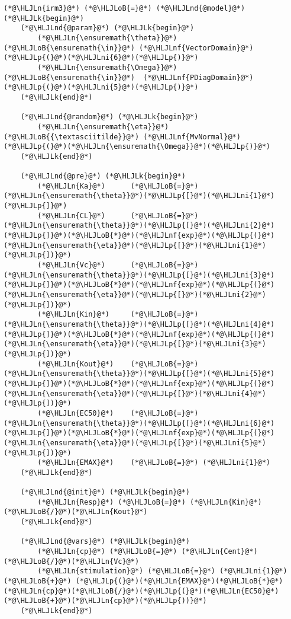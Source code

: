 \documentclass[12pt,a4paper]{article}
\newcommand{\HLJLk}[1]{\textcolor[RGB]{148,91,176}{\textbf{#1}}}
\newcommand{\HLJLn}[1]{#1}
\newcommand{\HLJLnd}[1]{\textcolor[RGB]{214,102,97}{#1}}
\newcommand{\HLJLnf}[1]{\textcolor[RGB]{66,102,213}{#1}}
\newcommand{\HLJLni}[1]{\textcolor[RGB]{59,151,46}{#1}}
\newcommand{\HLJLoB}[1]{\textcolor[RGB]{102,102,102}{\textbf{#1}}}
\newcommand{\HLJLp}[1]{#1}
\begin{document}
\begin{lstlisting}
(*@\HLJLn{irm3}@*) (*@\HLJLoB{=}@*) (*@\HLJLnd{@model}@*) (*@\HLJLk{begin}@*)
    (*@\HLJLnd{@param}@*) (*@\HLJLk{begin}@*)
        (*@\HLJLn{\ensuremath{\theta}}@*) (*@\HLJLoB{\ensuremath{\in}}@*) (*@\HLJLnf{VectorDomain}@*)(*@\HLJLp{(}@*)(*@\HLJLni{6}@*)(*@\HLJLp{)}@*)
        (*@\HLJLn{\ensuremath{\Omega}}@*) (*@\HLJLoB{\ensuremath{\in}}@*)  (*@\HLJLnf{PDiagDomain}@*)(*@\HLJLp{(}@*)(*@\HLJLni{5}@*)(*@\HLJLp{)}@*)
    (*@\HLJLk{end}@*)

    (*@\HLJLnd{@random}@*) (*@\HLJLk{begin}@*)
        (*@\HLJLn{\ensuremath{\eta}}@*) (*@\HLJLoB{{\textasciitilde}}@*) (*@\HLJLnf{MvNormal}@*)(*@\HLJLp{(}@*)(*@\HLJLn{\ensuremath{\Omega}}@*)(*@\HLJLp{)}@*)
    (*@\HLJLk{end}@*)

    (*@\HLJLnd{@pre}@*) (*@\HLJLk{begin}@*)
        (*@\HLJLn{Ka}@*)      (*@\HLJLoB{=}@*) (*@\HLJLn{\ensuremath{\theta}}@*)(*@\HLJLp{[}@*)(*@\HLJLni{1}@*)(*@\HLJLp{]}@*)
        (*@\HLJLn{CL}@*)      (*@\HLJLoB{=}@*) (*@\HLJLn{\ensuremath{\theta}}@*)(*@\HLJLp{[}@*)(*@\HLJLni{2}@*)(*@\HLJLp{]}@*)(*@\HLJLoB{*}@*)(*@\HLJLnf{exp}@*)(*@\HLJLp{(}@*)(*@\HLJLn{\ensuremath{\eta}}@*)(*@\HLJLp{[}@*)(*@\HLJLni{1}@*)(*@\HLJLp{])}@*)
        (*@\HLJLn{Vc}@*)      (*@\HLJLoB{=}@*) (*@\HLJLn{\ensuremath{\theta}}@*)(*@\HLJLp{[}@*)(*@\HLJLni{3}@*)(*@\HLJLp{]}@*)(*@\HLJLoB{*}@*)(*@\HLJLnf{exp}@*)(*@\HLJLp{(}@*)(*@\HLJLn{\ensuremath{\eta}}@*)(*@\HLJLp{[}@*)(*@\HLJLni{2}@*)(*@\HLJLp{])}@*)
        (*@\HLJLn{Kin}@*)     (*@\HLJLoB{=}@*) (*@\HLJLn{\ensuremath{\theta}}@*)(*@\HLJLp{[}@*)(*@\HLJLni{4}@*)(*@\HLJLp{]}@*)(*@\HLJLoB{*}@*)(*@\HLJLnf{exp}@*)(*@\HLJLp{(}@*)(*@\HLJLn{\ensuremath{\eta}}@*)(*@\HLJLp{[}@*)(*@\HLJLni{3}@*)(*@\HLJLp{])}@*)
        (*@\HLJLn{Kout}@*)    (*@\HLJLoB{=}@*) (*@\HLJLn{\ensuremath{\theta}}@*)(*@\HLJLp{[}@*)(*@\HLJLni{5}@*)(*@\HLJLp{]}@*)(*@\HLJLoB{*}@*)(*@\HLJLnf{exp}@*)(*@\HLJLp{(}@*)(*@\HLJLn{\ensuremath{\eta}}@*)(*@\HLJLp{[}@*)(*@\HLJLni{4}@*)(*@\HLJLp{])}@*)
        (*@\HLJLn{EC50}@*)    (*@\HLJLoB{=}@*) (*@\HLJLn{\ensuremath{\theta}}@*)(*@\HLJLp{[}@*)(*@\HLJLni{6}@*)(*@\HLJLp{]}@*)(*@\HLJLoB{*}@*)(*@\HLJLnf{exp}@*)(*@\HLJLp{(}@*)(*@\HLJLn{\ensuremath{\eta}}@*)(*@\HLJLp{[}@*)(*@\HLJLni{5}@*)(*@\HLJLp{])}@*)
        (*@\HLJLn{EMAX}@*)    (*@\HLJLoB{=}@*) (*@\HLJLni{1}@*)
    (*@\HLJLk{end}@*)

    (*@\HLJLnd{@init}@*) (*@\HLJLk{begin}@*)
        (*@\HLJLn{Resp}@*) (*@\HLJLoB{=}@*) (*@\HLJLn{Kin}@*)(*@\HLJLoB{/}@*)(*@\HLJLn{Kout}@*)
    (*@\HLJLk{end}@*)

    (*@\HLJLnd{@vars}@*) (*@\HLJLk{begin}@*)
        (*@\HLJLn{cp}@*) (*@\HLJLoB{=}@*) (*@\HLJLn{Cent}@*)(*@\HLJLoB{/}@*)(*@\HLJLn{Vc}@*)
        (*@\HLJLn{stimulation}@*) (*@\HLJLoB{=}@*) (*@\HLJLni{1}@*) (*@\HLJLoB{+}@*) (*@\HLJLp{(}@*)(*@\HLJLn{EMAX}@*)(*@\HLJLoB{*}@*)(*@\HLJLn{cp}@*)(*@\HLJLoB{/}@*)(*@\HLJLp{(}@*)(*@\HLJLn{EC50}@*)(*@\HLJLoB{+}@*)(*@\HLJLn{cp}@*)(*@\HLJLp{))}@*)
    (*@\HLJLk{end}@*)


\end{lstlisting}
\end{document}
